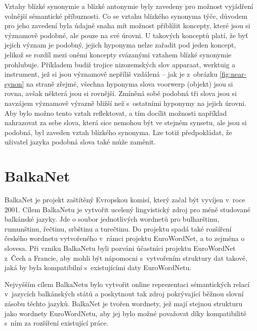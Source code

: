 \documentclass[a4paper,11pt,openany,twoside]{book}
\newcommand\ex{\textsf}
\begin{document}
				Vztahy blízké synonymie a blízké antonymie byly zavedeny pro možnost vyjádření volnější sémantické příbuznosti. \parencite{pazienza2008bottom} Co se vztahu blízkého synonyma  týče, důvodem pro jeho zavedení byla údajně snaha mít možnost přiblížit koncepty, které jsou si významově podobné, ale pouze na své úrovni. U takových konceptů platí, že byť jejich význam je podobný, jejich hyponyma nelze zařadit pod jeden koncept, jelikož se rozdíl mezi oněmi koncepty svázanými vztahem blízké synonymie prohlubuje. Příkladem budiž trojice nizozemských slov \ex{apparaat}, \ex{werktuig} a \ex{instrument}, jež si jsou významově nepříliš vzdálená -- jak je z~obrázku \ref{fig:near-synon} na straně \pageref{fig:near-synon} zřejmé, všechna hyponyma slova \ex{voorwerp} (\ex{objekt}) jsou si rovna, avšak některá jsou si rovnější. Zmíněná sobě podobná tři slova jsou si navzájem významově výrazně bližší než s~ostatními hyponymy na jejich úrovni. Aby bylo možno tento vztah reflektovat, a tím docílit možnosti například nahrazovat za sebe slova, která sice nemohou být ve stejném synsetu, ale jsou si podobná, byl zaveden vztah blízkého synonyma. Lze totiž předpokládat, že uživatel jazyka podobná slova také může zaměnit. \parencite{vossen1997eurowordnet}

				
			\section{BalkaNet}
			\label{cha:balkanet}

				BalkaNet je projekt zaštítěný Evropskou komisí, který začal být vyvíjen v~roce 2001. Cílem BalkaNetu je vytvořit ucelený lingvistický zdroj pro méně studované balkánské jazyky. Jde o soubor jednotlivých wordnetů pro bulharštinu, rumunštinu, řečtinu, srbštinu a turečtinu. Do projektu spadá také rozšíření českého wordnetu vytvořeného v~rámci projektu EuroWordNet, a to zejména o slovesa. Při vzniku BalkaNetu byli pozváni účastníci projektu EuroWordNet z~Čech a Francie, aby mohli být nápomocni s~vytvořením struktury dat takové, jaká by byla kompatibilní s~existujícími daty EuroWordNetu. \parencite{tufis2004balkanet}

				Nejvyšším cílem BalkaNetu bylo vytvořit online reprezentaci sémantických relací v~jazycích balkánských států a poskytnout tak zdroj pokrývající běžnou slovní zásobu těchto jazyků. BalkaNet je tvořen wordnety, jež mají stejnou strukturu jako wordnety EuroWordNetu, aby jej bylo možné považovat díky kompatibilitě s~ním za rozšíření existující práce. 
\end{document}
